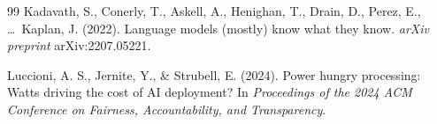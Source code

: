\documentclass[12pt]{article}
\begin{document}
\begin{thebibliography}{99}
Kadavath, S., Conerly, T., Askell, A., Henighan, T., Drain, D., Perez, E., \ldots\ Kaplan, J. (2022). Language models (mostly) know what they know. \textit{arXiv preprint} arXiv:2207.05221.

Luccioni, A. S., Jernite, Y., \& Strubell, E. (2024). Power hungry processing: Watts driving the cost of AI deployment? In \textit{Proceedings of the 2024 ACM Conference on Fairness, Accountability, and Transparency}.
\end{thebibliography}
\end{document}
